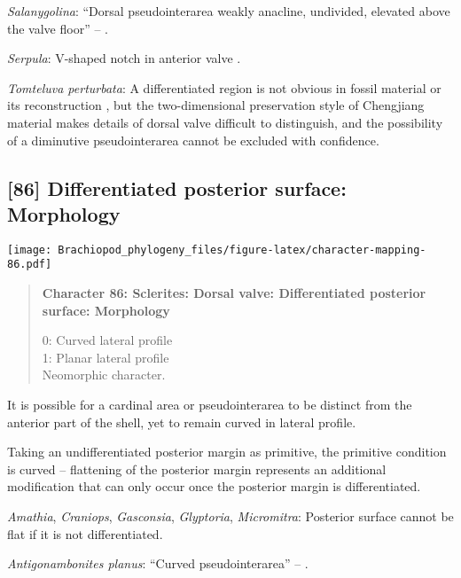 \documentclass[openany]{book}
\theoremstyle{definition}
\theoremstyle{definition}
\theoremstyle{definition}
\theoremstyle{remark}
\begin{document}
\hypertarget{Salanygolina-coding-85}{}
\emph{Salanygolina}: ``Dorsal pseudointerarea weakly anacline,
undivided, elevated above the valve floor'' --
\citet{Popov2009Earlyontogeny}.

\hypertarget{Serpula-coding-85}{}
\emph{Serpula}: V-shaped notch in anterior valve \citep{Schwabe2010}.

\hypertarget{Tomteluva_perturbata-coding-85}{}
\emph{Tomteluva perturbata}: A differentiated region is not obvious in
fossil material or its reconstruction \citep{Zhang2014Anearly}, but the
two-dimensional preservation style of Chengjiang material makes details
of dorsal valve difficult to distinguish, and the possibility of a
diminutive pseudointerarea cannot be excluded with confidence.

\subsection*{{[}86{]} Differentiated posterior surface:
Morphology}\label{differentiated-posterior-surface-morphology}

\texttt{[image: Brachiopod\_phylogeny\_files/figure-latex/character-mapping-86.pdf]}

\begin{quote}
\textbf{Character 86: Sclerites: Dorsal valve: Differentiated posterior
surface: Morphology}

0: Curved lateral profile\\
1: Planar lateral profile\\
Neomorphic character.
\end{quote}

It is possible for a cardinal area or pseudointerarea to be distinct
from the anterior part of the shell, yet to remain curved in lateral
profile.

Taking an undifferentiated posterior margin as primitive, the primitive
condition is curved -- flattening of the posterior margin represents an
additional modification that can only occur once the posterior margin is
differentiated.

\hypertarget{Amathia-coding-86}{}
\emph{Amathia}, \emph{Craniops}, \emph{Gasconsia}, \emph{Glyptoria},
\emph{Micromitra}: Posterior surface cannot be flat if it is not
differentiated.

\hypertarget{Antigonambonites_planus-coding-86}{}
\emph{Antigonambonites planus}: ``Curved pseudointerarea'' --
\citet{Skovsted2017Depthrelated}.
\end{document}
